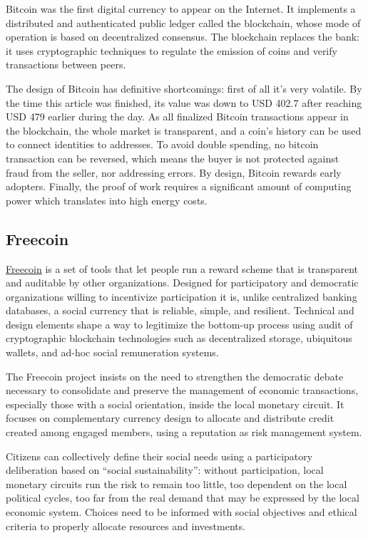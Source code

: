 Bitcoin was the first digital currency to appear on the Internet. It
implements a distributed and authenticated public ledger called the
blockchain, whose mode of operation is based on decentralized consensus.
The blockchain replaces the bank: it uses cryptographic techniques to
regulate the emission of coins and verify transactions between peers.

The design of Bitcoin has definitive shortcomings: first of all it's
very volatile. By the time this article was finished, its value was down
to USD 402.7 after reaching USD 479 earlier during the day. As all
finalized Bitcoin transactions appear in the blockchain, the whole
market is transparent, and a coin's history can be used to connect
identities to addresses. To avoid double spending, no bitcoin
transaction can be reversed, which means the buyer is not protected
against fraud from the seller, nor addressing errors. By design, Bitcoin
rewards early adopters. Finally, the proof of work requires a
significant amount of computing power which translates into high energy
costs.

\subsection{Freecoin}\label{freecoin}

\href{http://freecoin.ch/}{Freecoin} is a set of tools that let people
run a reward scheme that is transparent and auditable by other
organizations. Designed for participatory and democratic organizations
willing to incentivize participation it is, unlike centralized banking
databases, a social currency that is reliable, simple, and resilient.
Technical and design elements shape a way to legitimize the bottom-up
process using audit of cryptographic blockchain technologies such as
decentralized storage, ubiquitous wallets, and ad-hoc social
remuneration systems.

The Freecoin project insists on the need to strengthen the democratic
debate necessary to consolidate and preserve the management of economic
transactions, especially those with a social orientation, inside the
local monetary circuit. It focuses on complementary currency design to
allocate and distribute credit created among engaged members, using a
reputation as risk management system.

Citizens can collectively define their social needs using a
participatory deliberation based on ``social sustainability'': without
participation, local monetary circuits run the risk to remain too
little, too dependent on the local political cycles, too far from the
real demand that may be expressed by the local economic system. Choices
need to be informed with social objectives and ethical criteria to
properly allocate resources and investments.

